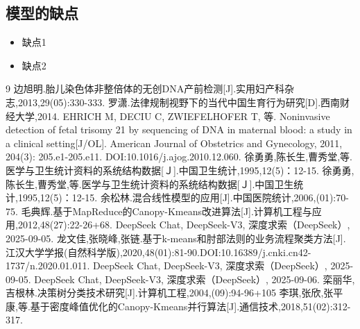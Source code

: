 \documentclass[withoutpreface,bwprint]{cumcmthesis}
\begin{document}
\subsection{模型的缺点}
\begin{itemize}[itemindent=2em]
\item 缺点1
\item 缺点2
\end{itemize}

\nocite{*}
\begin{thebibliography}{9}%
 边旭明.胎儿染色体非整倍体的无创DNA产前检测[J].实用妇产科杂志,2013,29(05):330-333.
 罗潇.法律规制视野下的当代中国生育行为研究[D].西南财经大学,2014.
 EHRICH M, DECIU C, ZWIEFELHOFER T, 等. Noninvasive detection of fetal trisomy 21 by sequencing of DNA in maternal blood: a study in a clinical setting[J/OL]. American Journal of Obstetrics and Gynecology, 2011, 204(3): 205.e1-205.e11. DOI:10.1016/j.ajog.2010.12.060.
 徐勇勇,陈长生,曹秀堂,等.医学与卫生统计资料的系统结构数据[Ｊ].中国卫生统计,1995,12(5)：12-15.
徐勇勇,陈长生,曹秀堂,等.医学与卫生统计资料的系统结构数据[Ｊ].中国卫生统计,1995,12(5)：12-15.
余松林.混合线性模型的应用[J].中国医院统计,2006,(01):70-75.
毛典辉.基于MapReduce的Canopy-Kmeans改进算法[J].计算机工程与应用,2012,48(27):22-26+68.
DeepSeek Chat, DeepSeek-V3, 深度求索（DeepSeek）, 2025-09-05.
龙文佳,张晓峰,张链.基于k-means和肘部法则的业务流程聚类方法[J].江汉大学学报(自然科学版),2020,48(01):81-90.DOI:10.16389/j.cnki.cn42-1737/n.2020.01.011.
DeepSeek Chat, DeepSeek-V3, 深度求索（DeepSeek）, 2025-09-05.
DeepSeek Chat, DeepSeek-V3, 深度求索（DeepSeek）, 2025-09-06.
栾丽华,吉根林.决策树分类技术研究[J].计算机工程,2004,(09):94-96+105
李琪,张欣,张平康,等.基于密度峰值优化的Canopy-Kmeans并行算法[J].通信技术,2018,51(02):312-317.
\end{thebibliography}
\newpage
\end{document}
